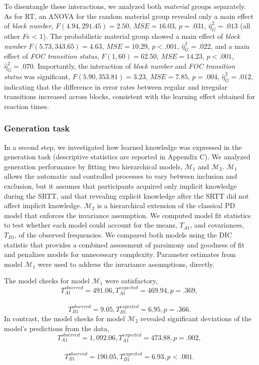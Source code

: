 \documentclass[english,,man]{apa6}
\begin{document}
To disentangle these interactions, we analyzed both \emph{material} groups separately.
As for RT, an ANOVA for the random material group revealed only a main effect of \emph{block number},
\(F(4.94, 291.45) = 2.50\), \(\mathit{MSE} = 16.03\), \(p = .031\), \(\hat{\eta}^2_G = .013\) (all other \emph{F}s \textless{} 1).
The probabilistic material group showed a main effect of \emph{block number}
\(F(5.73, 343.65) = 4.63\), \(\mathit{MSE} = 10.29\), \(p < .001\), \(\hat{\eta}^2_G = .022\),
and a main effect of \emph{FOC transition status},
\(F(1, 60) = 62.50\), \(\mathit{MSE} = 14.23\), \(p < .001\), \(\hat{\eta}^2_G = .070\).
Importantly, the interaction of \emph{block number} and \emph{FOC transition status} was significant,
\(F(5.90, 353.81) = 3.23\), \(\mathit{MSE} = 7.85\), \(p = .004\), \(\hat{\eta}^2_G = .012\), indicating that the difference in error rates between regular and irregular transitions increased across blocks, consistent with the learning effect obtained for reaction times.

\hypertarget{generation-task-1}{%
\subsubsection{Generation task}\label{generation-task-1}}

In a second step, we investigated how learned knowledge was expressed in the generation task (descriptive statistics are reported in Appendix C).
We analyzed generation performance by fitting two hierarchical models, \(\mathcal{M}_1\) and \(\mathcal{M}_2\).
\(\mathcal{M}_1\) allows the automatic and controlled processes to vary between inclusion and exclusion, but it assumes that participants acquired only implicit knowledge during the SRTT, and that revealing explicit knowledge after the SRTT did not affect implicit knowledge.
\(\mathcal{M}_2\) is a hierarchical extension of the classical PD model that enforces the invariance assumption.
We computed model fit statistics to test whether each model could account for the means, \(T_{A1}\), and covariances, \(T_{B1}\), of the observed frequencies.
We compared both models using the DIC statistic that provides a combined assessment of parsimony and goodness of fit and penalizes models for unnecessary complexity.
Parameter estimates from model \(\mathcal{M}_1\) were used to address the invariance assumptions, directly.

The model checks for model \(\mathcal{M}_1\) were satisfactory,
\[T_{A1}^{observed} = 491.06, T_{A1}^{expected} = 469.94, p = .369,\]~ \[T_{B1}^{observed} = 9.05, T_{B1}^{expected} = 6.95, p = .366.\]
In contrast, the model checks for model \(\mathcal{M}_2\) revealed significant deviations of the model's predictions from the data,
\[T_{A1}^{observed} = 1,092.06, T_{A1}^{expected} = 473.88, p = .002,\]~ \[T_{B1}^{observed} = 190.05, T_{B1}^{expected} = 6.93, p < .001.\]
\end{document}
